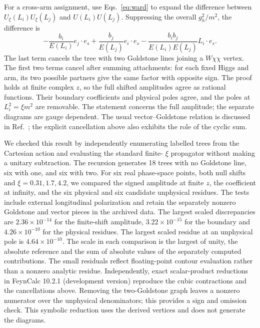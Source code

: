 \documentclass[11pt,a4paper]{article}
\begin{document}
For a cross-arm assignment, use
Eqs.~\eqref{eq:ward} to expand the difference between
\(U_\xi(L_i)U_\xi(L_j)\) and \(U(L_i)U(L_j)\).
Suppressing the overall \(g_h^2/m^2\), the difference is
\begin{equation}
 -\frac{b_i}{E(L_i)} e_j\cdot e_s
 +\frac{b_j}{E(L_j)} e_i\cdot e_s
 -\frac{b_i b_j}{E(L_i)E(L_j)}L_i\cdot e_s .
 \label{eq:difference}
\end{equation}
The last term cancels the tree with two Goldstone lines joining a
\(W\chi\chi\) vertex. The first two terms cancel after summing attachments:
for each fixed Higgs and arm, its two possible partners give the same
factor with opposite sign. The proof holds at finite complex \(z\),
so the full shifted amplitudes agree as rational functions. Their
boundary coefficients and physical poles agree, and the poles at
\(L_i^2=\xi m^2\) are removable. The statement concerns the full
amplitude; the separate diagrams are gauge dependent.
The usual vector--Goldstone relation is discussed in
Ref.~\cite{Chen}; the explicit cancellation above also exhibits the
role of the cyclic sum.

We checked this result by independently enumerating labelled trees
from the Cartesian action and evaluating the standard finite-
\(\xi\) propagator without making a unitary subtraction. The recursion
generates 18 trees with no Goldstone line, six with one, and six
with two. For six real phase-space points, both null shifts and
\(\xi=0.31,1.7,4.2\), we compared the signed amplitude at finite
\(z\), the coefficient at infinity, and the six physical and six
candidate unphysical residues. The tests include external longitudinal
polarization and retain the separately nonzero Goldstone and vector
pieces in the archived data. The largest scaled discrepancies are
\(2.36\times 10^{-14}\) for the finite-shift amplitude,
\(3.22\times 10^{-15}\) for the boundary and
\(4.26\times 10^{-10}\) for the physical residues. The largest
scaled residue at an unphysical pole is \(4.64\times 10^{-10}\).
The scale in each comparison is the largest of unity, the
absolute reference and the sum of absolute values of the separately
computed contributions. The small residuals reflect floating-point
contour evaluation rather than a nonzero analytic residue.
Independently, exact scalar-product reductions in FeynCalc
10.2.1 (development version) \cite{FeynCalc,FeynCalc102} reproduce the cubic
contractions and the cancellations above. Removing the
two-Goldstone graph leaves a nonzero numerator over the
unphysical denominators; this provides a sign and omission check.
This symbolic reduction uses the derived vertices and does not
generate the diagrams.
\end{document}

